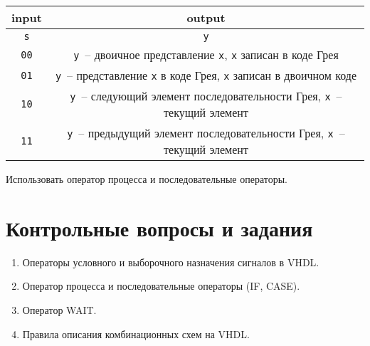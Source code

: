 \begin{table}[h]
\centering
\begin{tabular}{|c|c|}
\hline
input         & output                                                                                          \\ \hline
\lstinline?s? & \lstinline?y?                                                                                   \\ \hline
\texttt{00}   & \lstinline?y?~-- двоичное представление \lstinline?x?, \lstinline?x? записан в коде Грея        \\
\texttt{01}   & \lstinline?y?~-- представление \lstinline?x? в коде Грея, \lstinline?x? записан в двоичном коде \\
\texttt{10}   & \lstinline?y?~-- следующий элемент последовательности Грея, \lstinline?x?~-- текущий элемент    \\
\texttt{11}   & \lstinline?y?~-- предыдущий элемент последовательности Грея, \lstinline?x?~-- текущий элемент   \\
\hline
\end{tabular}
\end{table}

Использовать оператор процесса и последовательные операторы.

\section{Контрольные вопросы и задания}

\begin{enumerate}
\item Операторы условного и выборочного назначения сигналов в VHDL.
\item Оператор процесса и последовательные операторы (IF, CASE).
\item Оператор WAIT.
\item Правила описания комбинационных схем на VHDL.
\end{enumerate}

